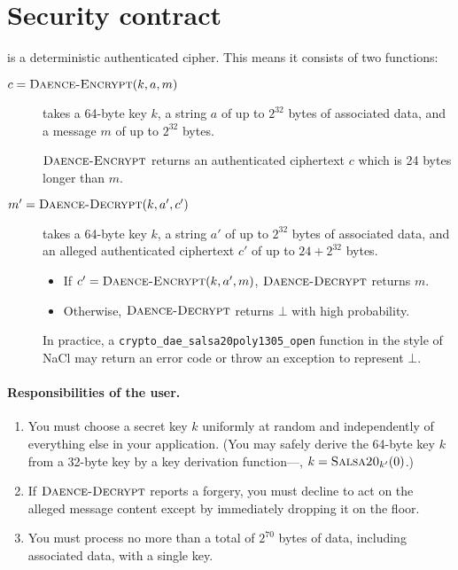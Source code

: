 \documentclass{article}
\def\operatorsc#1{{%
  \ifmmode\let\next=\operatorname\else\let\next=\relax\fi\next{\textsc{#1}}}}
\def\Salsa#1/{\operatorsc{Salsa#1}}
\def\DAENCE/{\operatorsc{Daence}}
\def\NaCl/{NaCl}
\DeclareMathOperator{\DaenceEncrypt}{\textsc{Daence-Encrypt}}
\DeclareMathOperator{\DaenceDecrypt}{\textsc{Daence-Decrypt}}
\begin{document}
\section{Security contract}

\DAENCE/ is a deterministic authenticated cipher.
This means it consists of two functions:
%
\begin{description}
  \item[\normalfont $c = \DaenceEncrypt(k, a, m)$] takes a 64-byte key
     $k$, a string $a$ of up to $2^{32}$ bytes of associated data, and
     a message $m$ of up to $2^{32}$ bytes.

    $\DaenceEncrypt$ returns an authenticated ciphertext $c$ which is
     24 bytes longer than $m$.

  \item[\normalfont $m' = \DaenceDecrypt(k, a', c')$] takes a 64-byte
     key $k$, a string $a'$ of up to $2^{32}$ bytes of associated
     data, and an alleged authenticated ciphertext $c'$ of up to
     $24 + 2^{32}$ bytes.

    \begin{itemize}
      \item If $c' = \DaenceEncrypt(k, a', m)$, $\DaenceDecrypt$
         returns $m$.
      \item Otherwise, $\DaenceDecrypt$ returns $\bot$ with high
         probability.
    \end{itemize}

    In practice, a \texttt{crypto\_dae\_salsa20poly1305\_open}
     function in the style of \NaCl/ may return an error code or
     throw an exception to represent $\bot$.
\end{description}

\paragraph*{Responsibilities of the user.}

\begin{enumerate}
  \item You must choose a secret key $k$ uniformly at random and
     independently of everything else in your application.
    (You may safely derive the 64-byte key $k$ from a 32-byte
     key by a key derivation function---\eg, $k = \Salsa20/_{k'}(0)$.)

  \item If $\DaenceDecrypt$ reports a forgery, you must decline to act
     on the alleged message content except by immediately dropping it
     on the floor.

  \item You must process no more than a total of $2^{70}$ bytes of
     data, including associated data, with a single key.
\end{enumerate}
\end{document}

